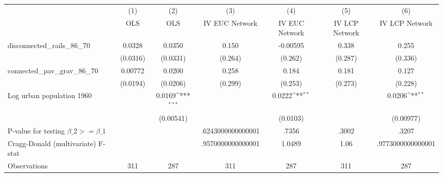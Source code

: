 {
\def\sym#1{\ifmmode^{#1}\else\(^{#1}\)\fi}
\begin{tabular}{l*{6}{c}}
\hline\hline
                &\multicolumn{1}{c}{(1)}&\multicolumn{1}{c}{(2)}&\multicolumn{1}{c}{(3)}&\multicolumn{1}{c}{(4)}&\multicolumn{1}{c}{(5)}&\multicolumn{1}{c}{(6)}\\
                &\multicolumn{1}{c}{OLS}&\multicolumn{1}{c}{OLS}&\multicolumn{1}{c}{IV EUC Network}&\multicolumn{1}{c}{IV EUC Network}&\multicolumn{1}{c}{IV LCP Network}&\multicolumn{1}{c}{IV LCP Network}\\
\hline
disconnected\_rails\_86\_70&   0.0328         &   0.0350         &    0.150         & -0.00595         &    0.338         &    0.255         \\
                & (0.0316)         & (0.0331)         &  (0.264)         &  (0.262)         &  (0.287)         &  (0.336)         \\
[1em]
connected\_pav\_grav\_86\_70&  0.00772         &   0.0200         &    0.258         &    0.184         &    0.181         &    0.127         \\
                & (0.0194)         & (0.0206)         &  (0.299)         &  (0.253)         &  (0.273)         &  (0.228)         \\
[1em]
Log urban population 1960&                  &   0.0169\sym{***}&                  &   0.0222\sym{**} &                  &   0.0206\sym{**} \\
                &                  &(0.00541)         &                  & (0.0103)         &                  &(0.00977)         \\
\hline
P-value for testing $\beta\_{2} >= \beta\_{1}$&                  &                  &.6243000000000001         &    .7356         &    .3002         &    .3207         \\
Cragg-Donald (multivariate) F-stat&                  &                  &.9570000000000001         &   1.0489         &     1.06         &.9773000000000001         \\
Observations    &      311         &      287         &      311         &      287         &      311         &      287         \\
\hline\hline
\end{tabular}
}
